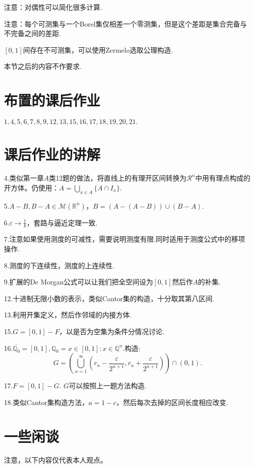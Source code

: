 \documentclass[bwprint, withoutpreface]{cumcmthesis}
\begin{document}
注意：对偶性可以简化很多计算.

注意：每个可测集与一个Borel集仅相差一个零测集，但是这个差距是集合完备与不完备之间的差距.

$[0, 1]$间存在不可测集，可以使用Zermelo选取公理构造.

本节之后的内容不作要求.

\appendix
\section{布置的课后作业}
\indent $1,4,5,6,7,8,9,12,13,15,16,17,18,19,20,21.$

\section{课后作业的讲解}
\indent 4.类似第一章$A$类12题的做法，将直线上的有理开区间转换为$\mathcal{R}^n$中用有理点构成的开方体。仍使用：$A = \bigcup_{x \in A}\{A \cap I_x\}$.

5.$A - B, B - A \in \mathcal{M}(\mathbb{R}^n)$，$B = (A - (A - B)) \cup (B - A)$.

6.$\varepsilon \to \frac{1}{k}$，套路与逼近定理一致.

7.注意如果使用测度的可减性，需要说明测度有限.同时适用于测度公式中的移项操作.

8.测度的下连续性，测度的上连续性.

9.扩展的De Morgan公式可以让我们把全空间设为$[0, 1]$然后作$A$的补集.

12.十进制无限小数的表示，类似Cantor集的构造，十分取其第八区间.

13.利用开集定义，然后作邻域的内接方体.

15.$G = [0, 1] - F$，以是否为空集为条件分情况讨论.

16.$\overline{\mathbb{Q}_0} = [0, 1], \mathbb{Q}_0 = {x \in [0, 1]: x \in \mathbb{Q}^n}$.构造:
\begin{equation*}
	G = (\bigcup_{n = 1}^{\infty}{(r_n - \frac{\varepsilon}{2^{n + 1}}, r_n + \frac{\varepsilon}{2^{n + 1}})}) \cap (0, 1).
\end{equation*}

17.$F = [0, 1] - G$. $G$可以按照上一题方法构造.

18.类似Cantor集构造方法，$a = 1 - c$，然后每次去掉的区间长度相应改变.

\section{一些闲谈}
\indent 注意，以下内容仅代表本人观点。
\end{document}
